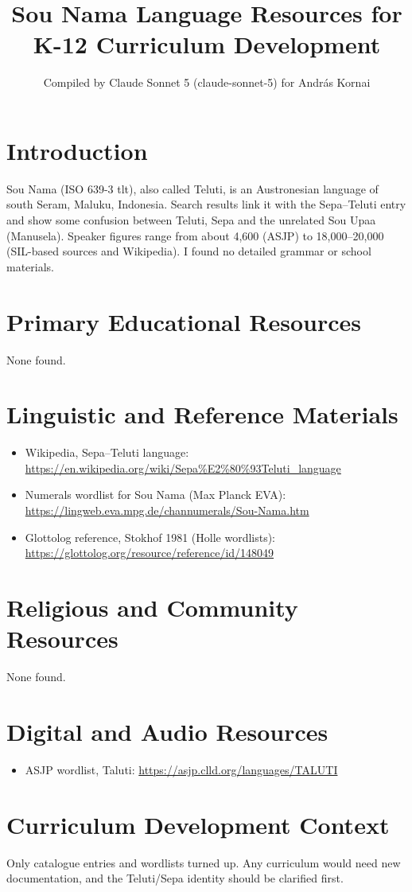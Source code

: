 \documentclass[12pt]{article}
\title{Sou Nama Language Resources for K-12 Curriculum Development}
\author{Compiled by Claude Sonnet 5 (claude-sonnet-5) for Andr\'as Kornai}
\date{}
\begin{document}
\maketitle

\section{Introduction}
Sou Nama (ISO 639-3 tlt), also called Teluti, is an Austronesian language of south Seram, Maluku, Indonesia. Search results link it with the Sepa--Teluti entry and show some confusion between Teluti, Sepa and the unrelated Sou Upaa (Manusela). Speaker figures range from about 4,600 (ASJP) to 18,000--20,000 (SIL-based sources and Wikipedia). I found no detailed grammar or school materials.

\section{Primary Educational Resources}
None found.

\section{Linguistic and Reference Materials}
\begin{itemize}
\item Wikipedia, Sepa--Teluti language: \url{https://en.wikipedia.org/wiki/Sepa%E2%80%93Teluti_language}
\item Numerals wordlist for Sou Nama (Max Planck EVA): \url{https://lingweb.eva.mpg.de/channumerals/Sou-Nama.htm}
\item Glottolog reference, Stokhof 1981 (Holle wordlists): \url{https://glottolog.org/resource/reference/id/148049}
\end{itemize}

\section{Religious and Community Resources}
None found.

\section{Digital and Audio Resources}
\begin{itemize}
\item ASJP wordlist, Taluti: \url{https://asjp.clld.org/languages/TALUTI}
\end{itemize}

\section{Curriculum Development Context}
Only catalogue entries and wordlists turned up. Any curriculum would need new documentation, and the Teluti/Sepa identity should be clarified first.
\end{document}

